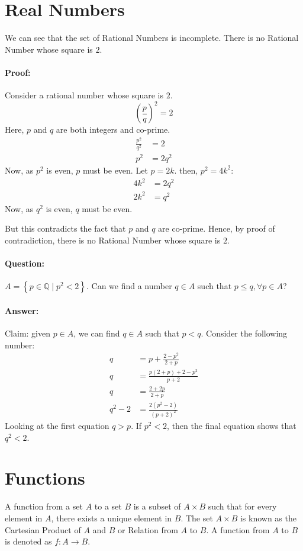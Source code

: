 \documentclass[12pt, oneside]{book}
\begin{document}
\section{Real Numbers}
We can see that the set of Rational Numbers is incomplete.
There is no Rational Number whose square is \(2\).
\paragraph{Proof:} Consider a rational number whose square is \(2\).
\[ \left(\frac{p}{q}\right)^2 = 2 \]
Here, \(p\) and \(q\) are both integers and co-prime.
\begin{align*}
    \frac{p^2}{q^2} &= 2 \\
    p^2 &= 2q^2
\end{align*}
Now, as \(p^2\) is even, \(p\) must be even.
Let \(p = 2k\). then, \(p^2 = 4k^2\): 
\begin{align*}
    4k^2 &= 2q^2 \\
    2k^2 &= q^2
\end{align*}
Now, as \(q^2\) is even, \(q\) must be even.

But this contradicts the fact that \(p\) and \(q\) are co-prime.
Hence, by proof of contradiction, there is no Rational Number whose square is \(2\).

\paragraph{Question:} \(A = \left\{ p \in \mathbb{Q} \; | \; p^2 < 2 \right\}\).
Can we find a number \(q \in A\) such that \( p \leq q, \forall p \in A \)? 
\paragraph{Answer:} Claim: given \(p \in A\), we can find \(q \in A\) such that \(p < q\).
Consider the following number:
\begin{align*}
    q &= p + \frac{2-p^2}{2+p} \\
    q &= \frac{p\left(2+p\right) + 2 - p^2}{p +2}\\
    q &= \frac{2 + 2p}{2 + p} \\
    q^2 - 2 &= \frac{2\left(p^2 - 2\right)}{\left(p + 2\right)^2}
\end{align*}
Looking at the first equation \(q > p\). If \(p^2 < 2\), then the final equation shows that \(q^2 < 2\).

\section{Functions}
A function from a set \(A\) to a set \(B\) is a subset of \(A \times B\) such that for every element in \(A\), there exists a unique element in \(B\).
The set \(A \times B \) is known as the Cartesian Product of \(A\) and \(B\) or Relation from \(A\) to \(B\).
A function from \(A\) to \(B\) is denoted as \(f: A \to B\).
\end{document}
